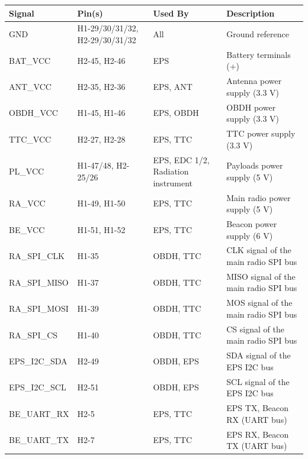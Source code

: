 \begin{table}[!h]
    \centering
    \begin{tabular}{lL{0.18\textwidth}L{0.19\textwidth}L{0.33\textwidth}}
        \toprule[1.5pt]
        \textbf{Signal}  & \textbf{Pin(s)} & \textbf{Used By}     & \textbf{Description} \\
        \midrule
        GND              & H1-29/30/31/32, H2-29/30/31/32 & All   & Ground reference \\
        BAT\_VCC         & H2-45, H2-46    & EPS                  & Battery terminals (+) \\
        ANT\_VCC         & H2-35, H2-36    & EPS, ANT             & Antenna power supply (3.3 V) \\
        OBDH\_VCC        & H1-45, H1-46    & EPS, OBDH            & OBDH power supply (3.3 V) \\
        TTC\_VCC         & H2-27, H2-28    & EPS, TTC             & TTC power supply (3.3 V) \\
        PL\_VCC          & H1-47/48, H2-25/26 & EPS, EDC 1/2, Radiation instrument & Payloads power supply (5 V) \\
        RA\_VCC          & H1-49, H1-50    & EPS, TTC             & Main radio power supply (5 V) \\
        BE\_VCC          & H1-51, H1-52    & EPS, TTC             & Beacon power supply (6 V) \\
        RA\_SPI\_CLK     & H1-35           & OBDH, TTC            & CLK signal of the main radio SPI bus \\
        RA\_SPI\_MISO    & H1-37           & OBDH, TTC            & MISO signal of the main radio SPI bus \\
        RA\_SPI\_MOSI    & H1-39           & OBDH, TTC            & MOS signal of the main radio SPI bus \\
        RA\_SPI\_CS      & H1-40           & OBDH, TTC            & CS signal of the main radio SPI bus \\
        EPS\_I2C\_SDA    & H2-49           & OBDH, EPS            & SDA signal of the EPS I2C bus \\
        EPS\_I2C\_SCL    & H2-51           & OBDH, EPS            & SCL signal of the EPS I2C bus \\
        BE\_UART\_RX     & H2-5            & EPS, TTC             & EPS TX, Beacon RX (UART bus) \\
        BE\_UART\_TX     & H2-7            & EPS, TTC             & EPS RX, Beacon TX (UART bus) \\

\end{tabular}
\end{table}
